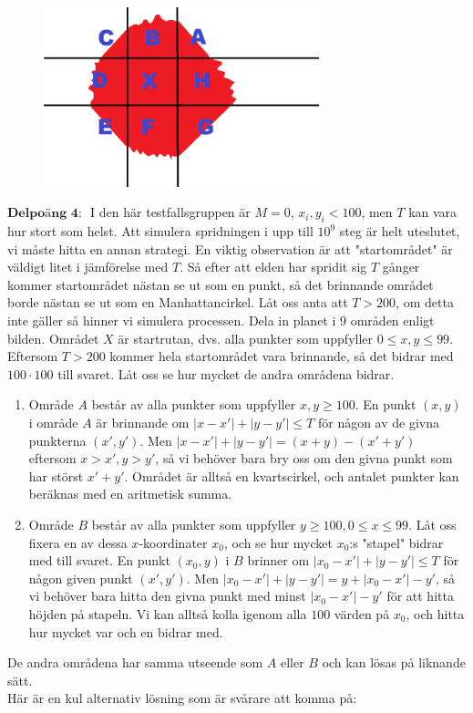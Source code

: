 \begin{figure}[!h]
\begin{center}
\includegraphics[width=8cm]{skogsbrand_bild.png}
\end{center}
\end{figure}

$\textbf{Delpoäng 4: }$ I den här testfallsgruppen är $M = 0$, $x_i, y_i < 100$, men $T$ kan vara hur stort som helst. Att simulera spridningen i upp till $10^9$ steg är helt uteslutet, vi måste hitta en annan strategi. En viktig observation är att "startområdet" är väldigt litet i jämförelse med $T$. Så efter att elden har spridit sig $T$ gånger kommer startområdet nästan se ut som en punkt, så det brinnande området borde nästan se ut som en Manhattancirkel. Låt oss anta att $T > 200$, om detta inte gäller så hinner vi simulera processen. Dela in planet i $9$ områden enligt bilden. Området $X$ är startrutan, dvs. alla punkter som uppfyller $0 \leq x,y \leq 99$. Eftersom $T > 200$ kommer hela startområdet vara brinnande, så det bidrar med $100\cdot 100$ till svaret. Låt oss se hur mycket de andra områdena bidrar. 
\begin{enumerate}

\item Område $A$ består av alla punkter som uppfyller $x,y \geq 100$. En punkt $(x,y)$ i område $A$ är brinnande om $|x-x'|+|y-y'| \leq T$ för någon av de givna punkterna $(x',y')$. Men $|x-x'|+|y-y'| = (x+y) - (x'+y')$ eftersom $x > x', y > y'$, så vi behöver bara bry oss om den givna punkt som har störst $x'+y'$. Området är alltså en kvartscirkel, och antalet punkter kan beräknas med en aritmetisk summa.

\item Område $B$ består av alla punkter som uppfyller $y \geq 100, 0 \leq x \leq 99$. Låt oss fixera en av dessa $x$-koordinater $x_0$, och se hur mycket $x_0$:s "stapel" bidrar med till svaret. En punkt $(x_0,y)$ i $B$ brinner om $|x_0-x'|+|y-y'| \leq T$ för någon given punkt $(x',y')$. Men $|x_0-x'| + |y-y'| = y + |x_0-x'|-y'$, så vi behöver bara hitta den givna punkt med minst $|x_0-x'|-y'$ för att hitta höjden på stapeln. Vi kan alltså kolla igenom alla $100$ värden på $x_0$, och hitta hur mycket var och en bidrar med.


\end{enumerate}
De andra områdena har samma utseende som $A$ eller $B$ och kan lösas på liknande sätt. \\
Här är en kul alternativ lösning som är svårare att komma på:

